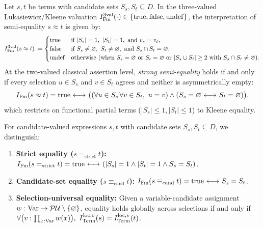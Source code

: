 \begin{definition}
\label{def:semi_equality_specification}
Let $s, t$ be terms with candidate sets $S_s, S_t \subseteq D$. In the three-valued Lukasiewicz/Kleene valuation $I_{\mathrm{Fm}}^{3\mathrm{val}}(\cdot) \in \{\mathrm{true}, \mathrm{false}, \mathrm{undef}\}$, the interpretation of semi-equality $s\approx t$ is given by:
\[
I_{\Fm}^{3\mathrm{val}}(s \approx t) :=
\begin{cases}
\ltrue & \text{if } |S_s| = 1,\ |S_t| = 1,\ \text{and } v_s = v_t, \\
\lfalse & \text{if } S_s \ne \emptyclass,\ S_t \ne \emptyclass,\ \text{and } S_s \cap S_t = \emptyclass, \\
\lundef & \text{otherwise (when } S_s = \emptyclass \text{ or } S_t = \emptyclass \text{ or } |S_s \cup S_t| \ge 2 \text{ with } S_s \cap S_t \ne \emptyclass\text{)}.
\end{cases}
\]
At the two-valued classical assertion level, \emph{strong semi-equality} holds if and only if every selection $u \in S_s$ and $v \in S_t$ agrees and neither is asymmetrically empty:
\[
I_{\mathrm{Fm}}(s \approx t) = \mathrm{true} {\ \longleftrightarrow\ } \big((\forall u \in S_s\, \forall v \in S_t,\ u = v) \land (S_s = \varnothing {\ \longleftrightarrow\ } S_t = \varnothing)\big),
\]
which restricts on functional partial terms ($|S_s| \le 1, |S_t| \le 1$) to Kleene equality.
\end{definition}

\begin{definition}
For candidate-valued expressions $s, t$ with candidate sets $S_s, S_t \subseteq D$, we distinguish:
\begin{enumerate}
\item \textbf{Strict equality ($s =_{\mathrm{strict}} t$):} $I_{\mathrm{Fm}}(s =_{\mathrm{strict}} t) = \mathrm{true} {\ \longleftrightarrow\ } (|S_s| = 1 \land |S_t| = 1 \land S_s = S_t)$.
\item \textbf{Candidate-set equality ($s \equiv_{\mathrm{cand}} t$):} $I_{\mathrm{Fm}}(s \equiv_{\mathrm{cand}} t) = \mathrm{true} {\ \longleftrightarrow\ } S_s = S_t$.
\item \textbf{Selection-universal equality:} Given a variable-candidate assignment $w : \mathrm{Var} \to \mathcal{P} \mathcal{U} \setminus \{\varnothing\}$, equality holds globally across selections if and only if $\forall \bigl(v : \prod_{x:\mathrm{Var}} w(x)\bigr),\ I_{\mathrm{Term}}^{\mathrm{loc},v}(s) = I_{\mathrm{Term}}^{\mathrm{loc},v}(t)$.
\end{enumerate}
\end{definition}

